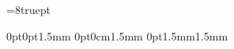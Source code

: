 \usepackage{geometry} %
\flushbottom
\geometry{
  a4paper,
  left=1cm,
  right=1.5cm,
  headsep = 1cm,            %
  headheight = 0.3cm,       %
  top=3cm,
  bottom=3cm,
  footskip=1.5cm            %
}
\parskip=8truept
\parindent=0mm

\usepackage{titlesec}
\titlespacing*{\section}
{0pt}{0pt}{1.5mm} 
\titlespacing*{\subsection}
{0pt}{0cm}{1.5mm}
\titlespacing*{\subsubsection}
{0pt}{1.5mm}{1.5mm}

\newcommand{\horline}{\vspace{-6mm}\begin{flushleft}\mbox{}\hrulefill\mbox{}
\end{flushleft}\vspace{-6mm}} %

\usepackage{fancyhdr} %


\usepackage{mathtools} %


